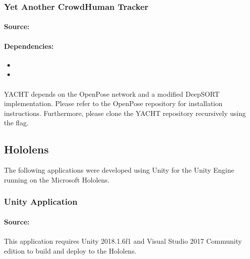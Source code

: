 \begin{appendices}
\subsubsection{Yet Another CrowdHuman Tracker}
\paragraph{Source:} 

\paragraph{Dependencies:}
\begin{itemize}
	\item {}
	\item {}
\end{itemize}

\paragraph{}YACHT depends on the OpenPose network and a modified DeepSORT implementation. Please refer to the OpenPose repository for installation instructions. Furthermore, please clone the YACHT repository recursively using the  flag.

\subsection{Hololens}
The following applications were developed using Unity for the Unity Engine running on the Microsoft Hololens.

\subsubsection{Unity Application}
\paragraph{Source:} 

\paragraph{}This application requires Unity 2018.1.6f1 and Visual Studio 2017 Community edition to build and deploy to the Hololens.


\end{appendices}

